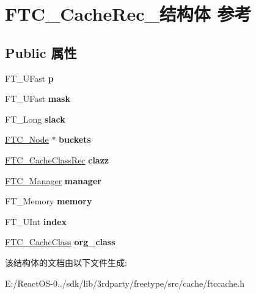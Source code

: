 \hypertarget{struct_f_t_c___cache_rec__}{}\section{F\+T\+C\+\_\+\+Cache\+Rec\+\_\+结构体 参考}
\label{struct_f_t_c___cache_rec__}
\subsection*{Public 属性}
\begin{DoxyCompactItemize}
\item 
\mbox{\label{struct_f_t_c___cache_rec___a205c7df4d202f5061b819a51930b5a1f}} 
F\+T\+\_\+\+U\+Fast {\bfseries p}
\item 
\mbox{\label{struct_f_t_c___cache_rec___aca20340deffda70ee03e5538a222657b}} 
F\+T\+\_\+\+U\+Fast {\bfseries mask}
\item 
\mbox{\label{struct_f_t_c___cache_rec___a5325ff0ab8b2f9c06e9379834b9813ef}} 
F\+T\+\_\+\+Long {\bfseries slack}
\item 
\mbox{\label{struct_f_t_c___cache_rec___ae1203a745e309bf6245abe162eb5b882}} 
\hyperlink{struct_f_t_c___node_rec__}{F\+T\+C\+\_\+\+Node} $\ast$ {\bfseries buckets}
\item 
\mbox{\label{struct_f_t_c___cache_rec___a35a9078d3c1300e150922c66233268d5}} 
\hyperlink{struct_f_t_c___cache_class_rec__}{F\+T\+C\+\_\+\+Cache\+Class\+Rec} {\bfseries clazz}
\item 
\mbox{\label{struct_f_t_c___cache_rec___aec65ef3c6235023c6caa74ceb41d2d3f}} 
\hyperlink{struct_f_t_c___manager_rec__}{F\+T\+C\+\_\+\+Manager} {\bfseries manager}
\item 
\mbox{\label{struct_f_t_c___cache_rec___a2765f249e995da02dc9f01edcaee9b0d}} 
F\+T\+\_\+\+Memory {\bfseries memory}
\item 
\mbox{\label{struct_f_t_c___cache_rec___a14be310ca9fada54a2ea9997186fd30e}} 
F\+T\+\_\+\+U\+Int {\bfseries index}
\item 
\mbox{\label{struct_f_t_c___cache_rec___a35e388c8e391a2bbe4ff6b0f19386f6e}} 
\hyperlink{struct_f_t_c___cache_class_rec__}{F\+T\+C\+\_\+\+Cache\+Class} {\bfseries org\+\_\+class}
\end{DoxyCompactItemize}


该结构体的文档由以下文件生成\+:\begin{DoxyCompactItemize}
\item 
E\+:/\+React\+O\+S-\/0../sdk/lib/3rdparty/freetype/src/cache/ftccache.\+h\end{DoxyCompactItemize}
